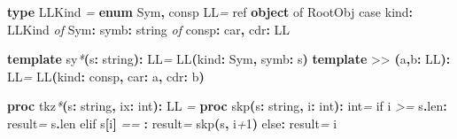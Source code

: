 \documentclass[
  12pt,
]{book}
\newenvironment{Shaded}{}{}
\newcommand{\CharTok}[1]{\textcolor[rgb]{0.25,0.44,0.63}{#1}}
\newcommand{\CommentTok}[1]{\textcolor[rgb]{0.38,0.63,0.69}{\textit{#1}}}
\newcommand{\DataTypeTok}[1]{\textcolor[rgb]{0.56,0.13,0.00}{#1}}
\newcommand{\DecValTok}[1]{\textcolor[rgb]{0.25,0.63,0.44}{#1}}
\newcommand{\KeywordTok}[1]{\textcolor[rgb]{0.00,0.44,0.13}{\textbf{#1}}}
\newcommand{\NormalTok}[1]{#1}
\newcommand{\OtherTok}[1]{\textcolor[rgb]{0.00,0.44,0.13}{#1}}
\newcommand{\StringTok}[1]{\textcolor[rgb]{0.25,0.44,0.63}{#1}}
\begin{document}
\begin{Shaded}
\begin{Highlighting}[]
\KeywordTok{type}
   \DataTypeTok{LLKind} \CommentTok{=} \KeywordTok{enum }\DataTypeTok{Sym}\KeywordTok{,}\NormalTok{ consp}
   \DataTypeTok{LL}\CommentTok{=} \DataTypeTok{ref} \KeywordTok{object }\DataTypeTok{of}\CommentTok{ }\DataTypeTok{RootObj}
     \DataTypeTok{case}\NormalTok{ kind}\KeywordTok{:} \DataTypeTok{LLKind}
     \CommentTok{of} \DataTypeTok{Sym}\KeywordTok{:}\NormalTok{ symb}\KeywordTok{:} \DataTypeTok{string}
     \CommentTok{of}\NormalTok{ consp}\KeywordTok{:}\NormalTok{ car}\KeywordTok{,}\NormalTok{ cdr}\KeywordTok{:} \DataTypeTok{LL}

\KeywordTok{template }\StringTok{sy}\CommentTok{*}\KeywordTok{(}\NormalTok{s}\KeywordTok{:} \DataTypeTok{string}\KeywordTok{):}  \DataTypeTok{LL}\CommentTok{=} \DataTypeTok{LL}\KeywordTok{(}\NormalTok{kind}\KeywordTok{:} \DataTypeTok{Sym}\KeywordTok{,}\NormalTok{  symb}\KeywordTok{:}\NormalTok{ \textasciigrave{}s\textasciigrave{}}\KeywordTok{)}
\KeywordTok{template }\StringTok{\textasciigrave{}\textgreater{}\textgreater{}\textasciigrave{}}\CommentTok{ }\KeywordTok{(}\NormalTok{a}\KeywordTok{,}\NormalTok{b}\KeywordTok{:} \DataTypeTok{LL}\KeywordTok{):} \DataTypeTok{LL}\CommentTok{=} \DataTypeTok{LL}\KeywordTok{(}\NormalTok{kind}\KeywordTok{:}\NormalTok{ consp}\KeywordTok{,}\NormalTok{ car}\KeywordTok{:}\NormalTok{ a}\KeywordTok{,}\NormalTok{ cdr}\KeywordTok{:}\NormalTok{ b}\KeywordTok{)}

\KeywordTok{proc }\StringTok{tkz}\CommentTok{*}\KeywordTok{(}\NormalTok{s}\KeywordTok{:} \DataTypeTok{string}\KeywordTok{,}\NormalTok{  ix}\KeywordTok{:} \DataTypeTok{int}\KeywordTok{):} \DataTypeTok{LL} \CommentTok{=}
  \KeywordTok{proc }\StringTok{skp}\KeywordTok{(}\NormalTok{s}\KeywordTok{:} \DataTypeTok{string}\KeywordTok{,}\NormalTok{ i}\KeywordTok{:} \DataTypeTok{int}\KeywordTok{):} \DataTypeTok{int}\CommentTok{=}
    \DataTypeTok{if}\NormalTok{ i }\CommentTok{\textgreater{}=}\NormalTok{ s}\KeywordTok{.}\DataTypeTok{len}\KeywordTok{:} \OtherTok{result}\CommentTok{=}\NormalTok{ s}\KeywordTok{.}\DataTypeTok{len}
    \DataTypeTok{elif}\NormalTok{ s}\KeywordTok{[}\NormalTok{i}\KeywordTok{]} \CommentTok{==} \CharTok{\textquotesingle{} \textquotesingle{}} \KeywordTok{:} \OtherTok{result}\CommentTok{=} \DataTypeTok{skp}\KeywordTok{(}\NormalTok{s}\KeywordTok{,}\NormalTok{ i}\CommentTok{+}\DecValTok{1}\KeywordTok{)}
    \DataTypeTok{else}\KeywordTok{:} \OtherTok{result}\CommentTok{=}\NormalTok{ i}
  

\end{Highlighting}
\end{Shaded}
\end{document}
